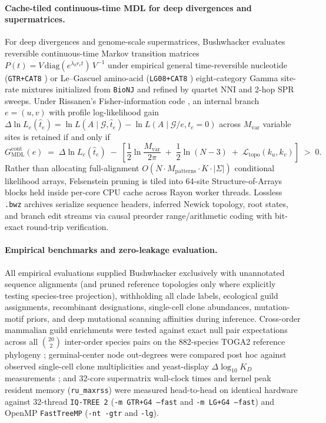 \documentclass[11pt,a4paper]{article}
\begin{document}
\paragraph{Cache-tiled continuous-time MDL for deep divergences and supermatrices.}
For deep divergences and genome-scale supermatrices, Bushwhacker evaluates reversible continuous-time Markov transition matrices $P(t) = V\,\mathrm{diag}(e^{\lambda_k r_c t})\,V^{-1}$ under empirical general time-reversible nucleotide (\texttt{GTR+CAT8} \citep{tavare1986some,yang1994maximum}) or Le--Gascuel amino-acid (\texttt{LG08+CAT8} \citep{le2008improved,yang1994maximum}) eight-category Gamma site-rate mixtures initialized from \texttt{BioNJ} \citep{gascuel1997bionj} and refined by quartet NNI and 2-hop SPR sweeps. Under Rissanen's Fisher-information code \citep{rissanen1983universal}, an internal branch $e = (u,v)$ with profile log-likelihood gain $\Delta\ln L_e(\hat{t}_e) = \ln L(A \mid \mathcal{G}, \hat{t}_e) - \ln L(A \mid \mathcal{G}/e, t_e = 0)$ across $M_{\text{var}}$ variable sites is retained if and only if
\begin{equation}
    G_{\text{MDL}}^{\text{cont}}(e) \;=\; \Delta\ln L_e(\hat{t}_e) \;-\; \left[\frac{1}{2}\ln\frac{M_{\text{var}}}{2\pi} \;+\; \frac{1}{2}\ln(N - 3) \;+\; \mathcal{L}_{\text{topo}}(k_u, k_v)\right] \;>\; 0.
    \label{eq:sci_cont_mdl}
\end{equation}
Rather than allocating full-alignment $O(N \cdot M_{\text{patterns}} \cdot K \cdot |\Sigma|)$ conditional likelihood arrays, Felsenstein pruning is tiled into 64-site Structure-of-Arrays blocks held inside per-core CPU cache across Rayon worker threads. Lossless \texttt{.bwz} archives serialize sequence headers, inferred Newick topology, root states, and branch edit streams via causal preorder range/arithmetic coding \citep{witten1987arithmetic} with bit-exact round-trip verification.

\paragraph{Empirical benchmarks and zero-leakage evaluation.}
All empirical evaluations supplied Bushwhacker exclusively with unannotated sequence alignments (and pruned reference topologies only where explicitly testing species-tree projection), withholding all clade labels, ecological guild assignments, recombinant designations, single-cell clone abundances, mutation-motif priors, and deep mutational scanning affinities during inference. Cross-order mammalian guild enrichments were tested against exact null pair expectations across all $\binom{20}{2}$ inter-order species pairs on the 882-species TOGA2 reference phylogeny \citep{malovichko2026toga2}; germinal-center node out-degrees were compared post hoc against observed single-cell clone multiplicities and yeast-display $\Delta\log_{10} K_D$ measurements \citep{dewitt2026gcreplay}; and 32-core supermatrix wall-clock times and kernel peak resident memory (\texttt{ru\_maxrss}) were measured head-to-head on identical hardware against 32-thread \texttt{IQ-TREE 2} (\texttt{-m GTR+G4 --fast} and \texttt{-m LG+G4 --fast}) and OpenMP \texttt{FastTreeMP} (\texttt{-nt -gtr} and \texttt{-lg}).
\end{document}

